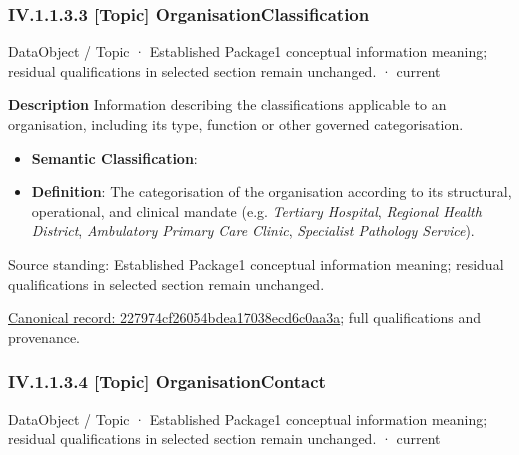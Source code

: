 \subsubsection*{IV.1.1.3.3 [Topic] OrganisationClassification}
\label{navigation:IV.1.1.3.3}

\label{element:227974cf26054bdea17038ecd6c0aa3a}
{\small DataObject / Topic · Established Package1 conceptual information meaning; residual qualifications in selected section remain unchanged. · current}\par

\textbf{Description}
Information describing the classifications applicable to an organisation, including its type, function or other governed categorisation.



\begin{itemize}


\item \textbf{Semantic Classification}: \texttt{}

\item \textbf{Definition}: The categorisation of the organisation according to its structural, operational, and clinical mandate (e.g. \emph{Tertiary Hospital}, \emph{Regional Health District}, \emph{Ambulatory Primary Care Clinic}, \emph{Specialist Pathology Service}).

\end{itemize}


Source standing: Established Package1 conceptual information meaning; residual qualifications in selected section remain unchanged.


{\footnotesize \href{../../../../continuum/application/data-object/topic/227974cf26054bdea17038ecd6c0aa3a.md}{Canonical record: 227974cf26054bdea17038ecd6c0aa3a}; full qualifications and provenance.}\par
\subsubsection*{IV.1.1.3.4 [Topic] OrganisationContact}
\label{navigation:IV.1.1.3.4}

\label{element:cad820b906fa40f28824278fb18b7497}
{\small DataObject / Topic · Established Package1 conceptual information meaning; residual qualifications in selected section remain unchanged. · current}\par

